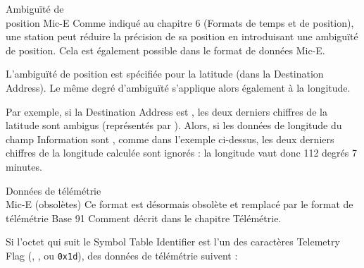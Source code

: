 \begin{aprssideblock}{Ambiguïté de\\position Mic-E}
Comme indiqué au chapitre 6 (Formats de temps et de position), une station peut
réduire la précision de sa position en introduisant une ambiguïté de position.
Cela est également possible dans le format de données Mic-E.

L'ambiguïté de position est spécifiée pour la latitude (dans la Destination
Address). Le même degré d'ambiguïté s'applique alors également à la longitude.

Par exemple, si la Destination Address est , les deux derniers
chiffres de la latitude sont ambigus (représentés par ). Alors, si les
données de longitude du champ Information sont , comme dans l'exemple
ci-dessus, les deux derniers chiffres de la longitude calculée sont ignorés :
la longitude vaut donc 112 degrés 7 minutes.
\end{aprssideblock}

\begin{aprssideblock}{Données de télémétrie\\Mic-E (obsolètes)}
Ce format est désormais obsolète et remplacé par le format de télémétrie
Base 91 Comment décrit dans le chapitre Télémétrie.

Si l'octet qui suit le Symbol Table Identifier est l'un des caractères
Telemetry Flag (, , ou \texttt{0x1d}), des données de
télémétrie suivent :
\end{aprssideblock}

\begin{center}
\small\sffamily\setlength{\tabcolsep}{4.5pt}\renewcommand{\arraystretch}{1.45}
\end{center}

